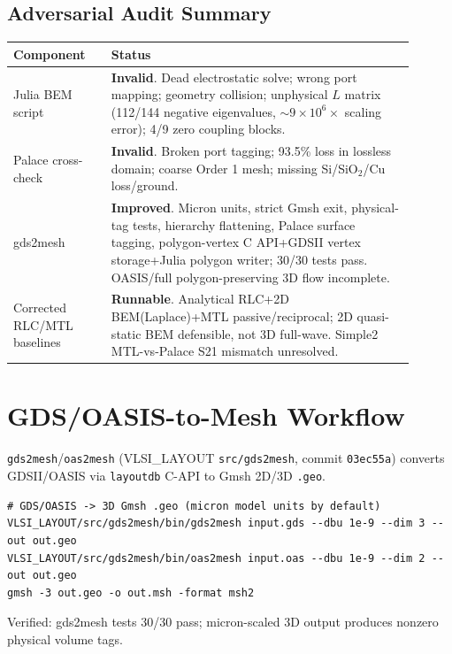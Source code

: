 \documentclass[12pt]{article}
\theoremstyle{definition}
\begin{document}
\subsection{Adversarial Audit Summary}

\begin{center}
\begin{tabular}{p{0.22\linewidth}p{0.68\linewidth}}
\toprule
Component & Status \\
\midrule
Julia BEM script & \textbf{Invalid}. Dead electrostatic solve; wrong port mapping; geometry collision; unphysical $L$ matrix (112/144 negative eigenvalues, $\sim9\times10^6\times$ scaling error); 4/9 zero coupling blocks. \\
Palace cross-check & \textbf{Invalid}. Broken port tagging; 93.5\% loss in lossless domain; coarse Order 1 mesh; missing Si/SiO$_2$/Cu loss/ground. \\
gds2mesh & \textbf{Improved}. Micron units, strict Gmsh exit, physical-tag tests, hierarchy flattening, Palace surface tagging, polygon-vertex C API+GDSII vertex storage+Julia polygon writer; 30/30 tests pass. OASIS/full polygon-preserving 3D flow incomplete. \\
Corrected RLC/MTL baselines & \textbf{Runnable}. Analytical RLC+2D BEM(Laplace)+MTL passive/reciprocal; 2D quasi-static BEM defensible, not 3D full-wave. Simple2 MTL-vs-Palace S21 mismatch unresolved. \\
\bottomrule
\end{tabular}
\end{center}

\section{GDS/OASIS-to-Mesh Workflow}

\texttt{gds2mesh}/\texttt{oas2mesh} (VLSI\_LAYOUT \texttt{src/gds2mesh}, commit \texttt{03ec55a}) converts GDSII/OASIS via \texttt{layoutdb} C-API to Gmsh 2D/3D \texttt{.geo}.

\begin{verbatim}
# GDS/OASIS -> 3D Gmsh .geo (micron model units by default)
VLSI_LAYOUT/src/gds2mesh/bin/gds2mesh input.gds --dbu 1e-9 --dim 3 --out out.geo
VLSI_LAYOUT/src/gds2mesh/bin/oas2mesh input.oas --dbu 1e-9 --dim 2 --out out.geo
gmsh -3 out.geo -o out.msh -format msh2
\end{verbatim}

\noindent Verified: gds2mesh tests 30/30 pass; micron-scaled 3D output produces nonzero physical volume tags.
\end{document}
